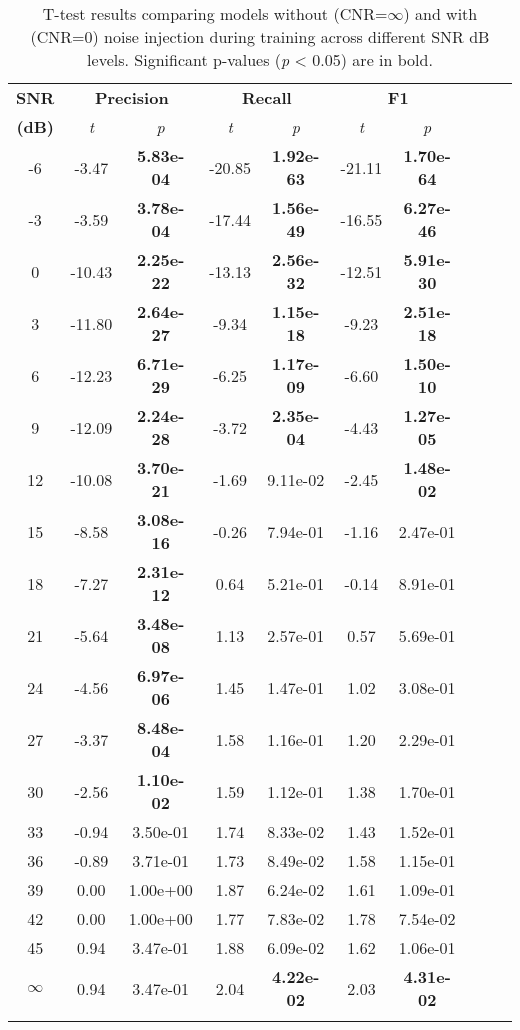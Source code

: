 \documentclass{article}
\begin{document}
\begin{table}[h!]
\centering
\caption{T-test results comparing models without (CNR=$\infty$) and with (CNR=0) noise injection during training across different SNR dB levels. Significant p-values (\textit{p} < 0.05) are in bold.}
\scriptsize
\begin{tabular}{@{}c ccc ccc ccc@{}} %
\toprule
\textbf{SNR} & \multicolumn{2}{c}{\textbf{Precision}} & \multicolumn{2}{c}{\textbf{Recall}} & \multicolumn{2}{c}{\textbf{F1}} \\ 
\textbf{(dB)} & \textit{t} & \textit{p} & \textit{t} & \textit{p} & \textit{t} & \textit{p} \\
\midrule
-6  & -3.47  & \textbf{5.83e-04}  & -20.85  & \textbf{1.92e-63}  & -21.11  & \textbf{1.70e-64} \\
-3  & -3.59  & \textbf{3.78e-04}  & -17.44  & \textbf{1.56e-49}  & -16.55  & \textbf{6.27e-46} \\
0   & -10.43 & \textbf{2.25e-22}  & -13.13  & \textbf{2.56e-32}  & -12.51  & \textbf{5.91e-30} \\
3   & -11.80 & \textbf{2.64e-27}  & -9.34   & \textbf{1.15e-18}  & -9.23   & \textbf{2.51e-18} \\
6   & -12.23 & \textbf{6.71e-29}  & -6.25   & \textbf{1.17e-09}  & -6.60   & \textbf{1.50e-10} \\
9   & -12.09 & \textbf{2.24e-28}  & -3.72   & \textbf{2.35e-04}  & -4.43   & \textbf{1.27e-05} \\
12  & -10.08 & \textbf{3.70e-21}  & -1.69   & 9.11e-02  & -2.45   & \textbf{1.48e-02} \\
15  & -8.58  & \textbf{3.08e-16}  & -0.26   & 7.94e-01  & -1.16   & 2.47e-01 \\
18  & -7.27  & \textbf{2.31e-12}  & 0.64    & 5.21e-01  & -0.14   & 8.91e-01 \\
21  & -5.64  & \textbf{3.48e-08}  & 1.13    & 2.57e-01  & 0.57    & 5.69e-01 \\
24  & -4.56  & \textbf{6.97e-06}  & 1.45    & 1.47e-01  & 1.02    & 3.08e-01 \\
27  & -3.37  & \textbf{8.48e-04}  & 1.58    & 1.16e-01  & 1.20    & 2.29e-01 \\
30  & -2.56  & \textbf{1.10e-02}  & 1.59    & 1.12e-01  & 1.38    & 1.70e-01 \\
33  & -0.94  & 3.50e-01  & 1.74    & 8.33e-02  & 1.43    & 1.52e-01 \\
36  & -0.89  & 3.71e-01  & 1.73    & 8.49e-02  & 1.58    & 1.15e-01 \\
39  & 0.00   & 1.00e+00  & 1.87    & 6.24e-02  & 1.61    & 1.09e-01 \\
42  & 0.00   & 1.00e+00  & 1.77    & 7.83e-02  & 1.78    & 7.54e-02 \\
45  & 0.94   & 3.47e-01  & 1.88    & 6.09e-02  & 1.62    & 1.06e-01 \\
$\infty$ & 0.94   & 3.47e-01  & 2.04    & \textbf{4.22e-02}  & 2.03    & \textbf{4.31e-02} \\
\bottomrule
\label{tab:4}
\end{tabular}
\end{table}
\end{document}
